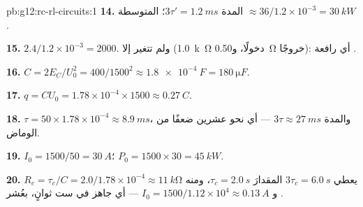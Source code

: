 \begin{solution}{pb:g12:rc-rl-circuits:1}
\textbf{14.} المدة $3\tau' = \qty{1.2}{ms}$؛  المتوسطة
$\approx 36/1.2\times10^{-3} = \qty{30}{kW}$.

\textbf{15.} $2.4/1.2\times10^{-3} = 2000$. ولم تتغير إلا 
(\qty{1.0}{k\ohm} دخولًا، و\qty{0.50}{\ohm} خروجًا): أي رافعة .

\textbf{16.} $C = 2E_C/U_0^2 = 400/1500^2 \approx \qty{1.8e-4}{F} =
\qty{180}{\micro F}$.

\textbf{17.} $q = CU_0 = 1.78\times10^{-4} \times 1500 \approx
\qty{0.27}{C}$.

\textbf{18.} $\tau = 50 \times 1.78\times10^{-4} \approx \qty{8.9}{ms}$،
والمدة $3\tau \approx \qty{27}{ms}$ --- أي نحو عشرين ضعفًا من الوماض.

\textbf{19.} $I_0 = 1500/50 = \qty{30}{A}$؛
$P_0 = 1500 \times 30 = \qty{45}{kW}$.

\textbf{20.} يعطي $3\tau_c = \qty{6.0}{s}$ المقدارَ $\tau_c = \qty{2.0}{s}$، ومنه
$R_c = \tau_c/C = 2.0/1.78\times10^{-4} \approx \qty{11}{k\ohm}$ و
$I_0 = 1500/1.12\times10^{4} \approx \qty{0.13}{A}$ --- أي جاهز في ست
ثوانٍ، بعُشر .
\end{solution}
